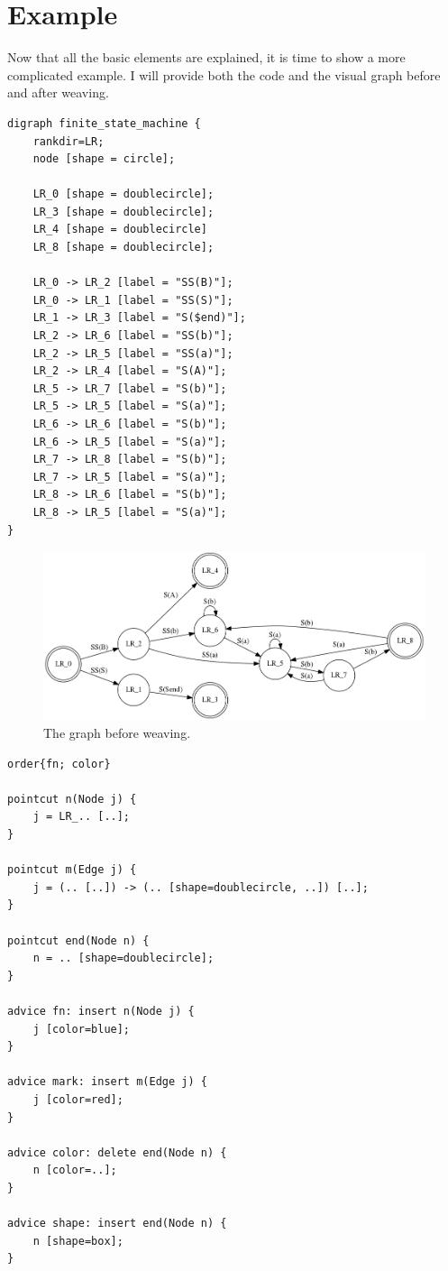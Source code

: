 \documentclass[a4paper]{report}
\begin{document}
\section{Example}
Now that all the basic elements are explained, it is time to show a more complicated example. I will provide both the code and the visual graph before and after weaving.
\begin{lstlisting}[multicols=2, caption=The source code.]
digraph finite_state_machine {
	rankdir=LR;
	node [shape = circle];

	LR_0 [shape = doublecircle];
	LR_3 [shape = doublecircle];
	LR_4 [shape = doublecircle]
	LR_8 [shape = doublecircle];

	LR_0 -> LR_2 [label = "SS(B)"];
	LR_0 -> LR_1 [label = "SS(S)"];
	LR_1 -> LR_3 [label = "S($end)"];
	LR_2 -> LR_6 [label = "SS(b)"];
	LR_2 -> LR_5 [label = "SS(a)"];
	LR_2 -> LR_4 [label = "S(A)"];
	LR_5 -> LR_7 [label = "S(b)"];
	LR_5 -> LR_5 [label = "S(a)"];
	LR_6 -> LR_6 [label = "S(b)"];
	LR_6 -> LR_5 [label = "S(a)"];
	LR_7 -> LR_8 [label = "S(b)"];
	LR_7 -> LR_5 [label = "S(a)"];
	LR_8 -> LR_6 [label = "S(b)"];
	LR_8 -> LR_5 [label = "S(a)"];
}
\end{lstlisting}
\begin{figure}[h!]
\includegraphics[width=\textwidth]{images/AOFDot/ExampleBefore.png}
\caption{The graph before weaving.}
\end{figure}
\begin{lstlisting}[multicols=2, caption=Aspect code.]
order{fn; color}

pointcut n(Node j) {
	j = LR_.. [..];
}

pointcut m(Edge j) {
	j = (.. [..]) -> (.. [shape=doublecircle, ..]) [..];
}

pointcut end(Node n) {
	n = .. [shape=doublecircle];
}

advice fn: insert n(Node j) {
	j [color=blue];
}

advice mark: insert m(Edge j) {
	j [color=red];
}

advice color: delete end(Node n) {
	n [color=..];
}

advice shape: insert end(Node n) {
	n [shape=box];
}
\end{lstlisting}
\end{document}
